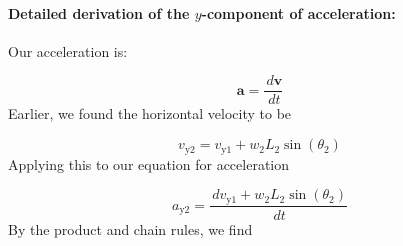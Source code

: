 \documentclass[12pt]{article}
\begin{document}
\paragraph{Detailed derivation of the $y$-component of acceleration:}
\label{GD:accelerationY2Deriv}
Our acceleration is:

\begin{displaymath}
\symbf{a}=\frac{\,d\symbf{v}}{\,dt}
\end{displaymath}
Earlier, we found the horizontal velocity to be

\begin{displaymath}
{v_{\text{y}2}}={v_{\text{y}1}}+{w_{2}} {L_{2}} \sin\left({θ_{2}}\right)
\end{displaymath}
Applying this to our equation for acceleration

\begin{displaymath}
{a_{\text{y}2}}=\frac{\,d{v_{\text{y}1}}+{w_{2}} {L_{2}} \sin\left({θ_{2}}\right)}{\,dt}
\end{displaymath}
By the product and chain rules, we find
\end{document}
